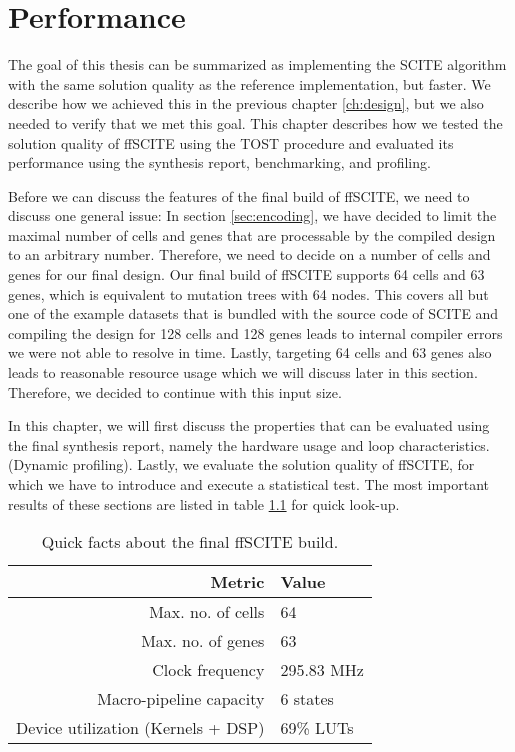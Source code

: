 \chapter{Performance}
\label{ch:performance}

The goal of this thesis can be summarized as implementing the \ac{SCITE} algorithm with the same solution quality as the reference implementation, but faster. We describe how we achieved this in the previous chapter \ref{ch:design}, but we also needed to verify that we met this goal. This chapter describes how we tested the solution quality of \ac{ffSCITE} using the \ac{TOST} procedure \cite{schuirmann1987comparison} and evaluated its performance using the synthesis report, benchmarking, and profiling. 

Before we can discuss the features of the final build of \ac{ffSCITE}, we need to discuss one general issue: In section \ref{sec:encoding}, we have decided to limit the maximal number of cells and genes that are processable by the compiled design to an arbitrary number. Therefore, we need to decide on a number of cells and genes for our final design. Our final build of \ac{ffSCITE} supports 64 cells and 63 genes, which is equivalent to mutation trees with 64 nodes. This covers all but one of the example datasets that is bundled with the source code of \ac{SCITE} and compiling the design for 128 cells and 128 genes leads to internal compiler errors we were not able to resolve in time. Lastly, targeting 64 cells and 63 genes also leads to reasonable resource usage which we will discuss later in this section. Therefore, we decided to continue with this input size.

In this chapter, we will first discuss the properties that can be evaluated using the final synthesis report, namely the hardware usage and loop characteristics. (Dynamic profiling). Lastly, we evaluate the solution quality of \ac{ffSCITE}, for which we have to introduce and execute a statistical test. The most important results of these sections are listed in table \ref{tab:quickfacts} for quick look-up.

\begin{table}
    \centering
    \begin{tabular}{r|l}
        \textbf{Metric}                     & \textbf{Value} \\
        \hline
        Max. no. of cells                   & 64 \\
        Max. no. of genes                   & 63 \\
        Clock frequency                     & 295.83 MHz \\
        Macro-pipeline capacity             & 6 states \\
        Device utilization (Kernels + DSP)  & 69\% \acsp{LUT}
    \end{tabular}
    \caption{Quick facts about the final \ac{ffSCITE} build.}
    \label{tab:quickfacts}
\end{table}



